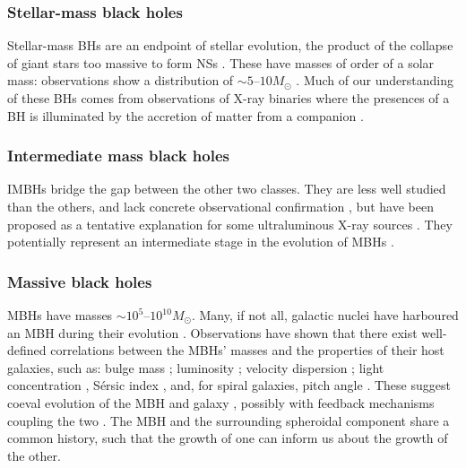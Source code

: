 \subsubsection{Stellar-mass black holes}

Stellar-mass BHs are an endpoint of stellar evolution, the product of the collapse of giant stars too massive to form NSs \citep{Postnov2006}. These have masses of order of a solar mass: observations show a distribution of $\sim5$--$10M_\odot$ \citep{Ozel2010,Farr2010}. Much of our understanding of these BHs comes from observations of X-ray binaries where the presences of a BH is illuminated by the accretion of matter from a companion \citep{Shakura1973,Remillard2006}.

\subsubsection{Intermediate mass black holes}

IMBHs bridge the gap between the other two classes. They are less well studied than the others, and lack concrete observational confirmation \citep{Miller2009a}, but have been proposed as a tentative explanation for some ultraluminous X-ray sources \citep{Feng2011}. They potentially represent an intermediate stage in the evolution of MBHs \citep{Graham2013}.

\subsubsection{Massive black holes}

MBHs have masses $\sim10^5$--$10^{10} M_\odot$. Many, if not all, galactic nuclei have harboured an MBH during their evolution \citep{Lynden-Bell1971, Soltan1982, Rees1984}. Observations have shown that there exist well-defined correlations between the MBHs' masses and the properties of their host galaxies, such as: bulge mass \citep{Kormendy1995,Haring2004,Graham2012a}; luminosity \citep{Magorrian1998,Marconi2003,Graham2013}; velocity dispersion \citep{Ferrarese2000,Gebhardt2000,Tremaine2002,Graham2011}; light concentration \citep{Graham2001}, S{\'e}rsic index \citep{Graham2007a,Savorgnan2013}, and, for spiral galaxies, pitch angle \citep{Seigar2008,Berrier2013}. These suggest coeval evolution of the MBH and galaxy \citep{Peng2007, Jahnke2011}, possibly with feedback mechanisms coupling the two \citep{Haiman2004, Volonteri2009}. The MBH and the surrounding spheroidal component share a common history, such that the growth of one can inform us about the growth of the other.

